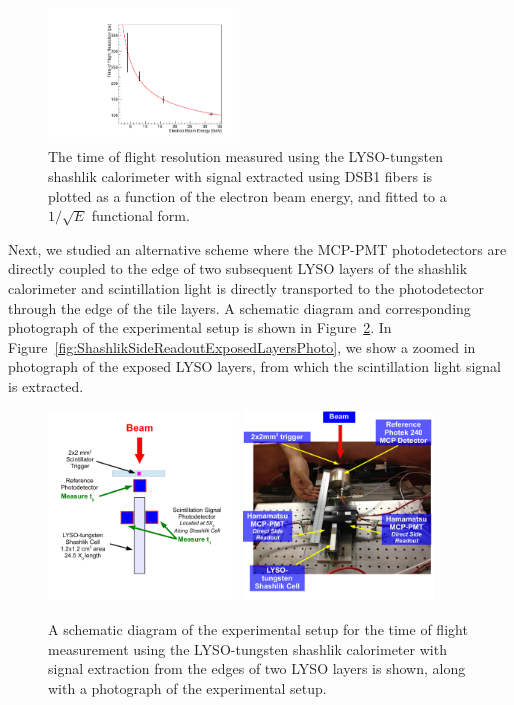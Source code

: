 \documentclass[12pt]{article}
\begin{document}
\begin{figure}[H] \centering
\includegraphics[width=0.45\textwidth]{figs/TimeResolutionVsEnergy_ShashlikDSB1Fiber} 
\caption{ The time of flight resolution measured using the LYSO-tungsten shashlik
calorimeter with signal extracted using DSB1 fibers is plotted as a function of
the electron beam energy, and fitted to a $1/\sqrt{E}$ functional form. }
\label{fig:ShashlikFiberTOFResolutionVsEnergy}
\end{figure}


Next, we studied an alternative scheme where the MCP-PMT photodetectors
are directly coupled to the edge of two subsequent LYSO layers of the
shashlik calorimeter and scintillation light is directly transported 
to the photodetector through the edge of the tile layers. 
A schematic diagram and corresponding photograph of
the experimental setup is shown in Figure~\ref{fig:ShashlikSideReadoutSetup}.
In Figure~\ref{fig:ShashlikSideReadoutExposedLayersPhoto}, we show
a zoomed in photograph of the exposed LYSO layers, from which the 
scintillation light signal is extracted.

\begin{figure}[H] \centering
\includegraphics[width=0.45\textwidth]{figs/ShashlikSideReadoutSetupSchematic} 
\includegraphics[width=0.45\textwidth]{figs/ShashlikSideReadoutPhotoB} 
\caption{ A schematic diagram of the experimental setup for the
time of flight measurement using the LYSO-tungsten shashlik calorimeter
with signal extraction from the edges of two LYSO layers is shown, along
with a photograph of the experimental setup. } 
\label{fig:ShashlikSideReadoutSetup}
\end{figure}
\end{document}
